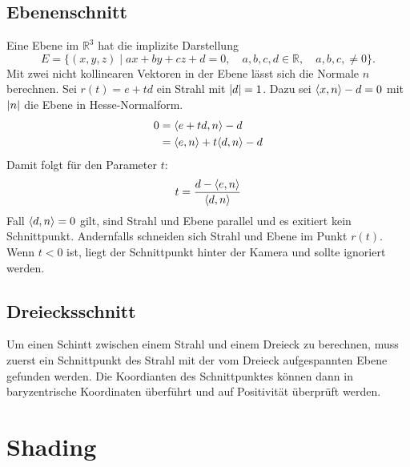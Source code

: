 \subsection{Ebenenschnitt}
Eine Ebene im $\mathbb{R}^3$ hat die implizite Darstellung
\[
	E = \{(x, y, z) \mid ax + by + cz + d = 0, \quad
	a, b, c, d \in \mathbb{R}, \quad
	a, b, c, \neq 0\} \text{.}
\]
Mit zwei nicht kollinearen Vektoren in der Ebene lässt sich die Normale $n$ berechnen.
Sei $r(t) = e + td$ ein Strahl mit $\vert d \vert = 1$.
Dazu sei $\langle x, n \rangle - d = 0$ mit $\vert n \vert$ die Ebene in Hesse-Normalform.
\begin{align*}
	0 &= \langle e + td, n \rangle - d \\
	  &= \langle e, n \rangle + t \langle d, n \rangle - d
\end{align*}
Damit folgt für den Parameter $t$:
\[
	t = \frac{d - \langle e, n \rangle}{\langle d, n \rangle}
\]
Fall $\langle d, n \rangle = 0$ gilt, sind Strahl und Ebene parallel und es exitiert kein Schnittpunkt.
Andernfalls schneiden sich Strahl und Ebene im Punkt $r(t)$.
Wenn $t < 0$ ist, liegt der Schnittpunkt hinter der Kamera und sollte ignoriert werden.

\subsection{Dreiecksschnitt}
Um einen Schintt zwischen einem Strahl und einem Dreieck zu berechnen, muss zuerst ein Schnittpunkt des Strahl mit der vom Dreieck aufgespannten Ebene gefunden werden.
Die Koordianten des Schnittpunktes können dann in baryzentrische Koordinaten überführt und auf Positivität überprüft werden.

\section{Shading}
